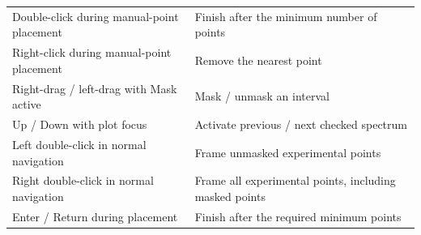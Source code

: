 \documentclass[
  10pt,
  a4paper,
  oneside]{scrreprt}
\begin{document}
\begin{longtable}[]{@{}ll@{}}
\begin{minipage}[t]{0.47\columnwidth}
Double-click during manual-point placement\strut
\end{minipage} & \begin{minipage}[t]{0.47\columnwidth}\raggedright
Finish after the minimum number of points\strut
\end{minipage}\tabularnewline
\begin{minipage}[t]{0.47\columnwidth}\raggedright
Right-click during manual-point placement\strut
\end{minipage} & \begin{minipage}[t]{0.47\columnwidth}\raggedright
Remove the nearest point\strut
\end{minipage}\tabularnewline
\begin{minipage}[t]{0.47\columnwidth}\raggedright
Right-drag / left-drag with Mask active\strut
\end{minipage} & \begin{minipage}[t]{0.47\columnwidth}\raggedright
Mask / unmask an interval\strut
\end{minipage}\tabularnewline
\begin{minipage}[t]{0.47\columnwidth}\raggedright
Up / Down with plot focus\strut
\end{minipage} & \begin{minipage}[t]{0.47\columnwidth}\raggedright
Activate previous / next checked spectrum\strut
\end{minipage}\tabularnewline
\begin{minipage}[t]{0.47\columnwidth}\raggedright
Left double-click in normal navigation\strut
\end{minipage} & \begin{minipage}[t]{0.47\columnwidth}\raggedright
Frame unmasked experimental points\strut
\end{minipage}\tabularnewline
\begin{minipage}[t]{0.47\columnwidth}\raggedright
Right double-click in normal navigation\strut
\end{minipage} & \begin{minipage}[t]{0.47\columnwidth}\raggedright
Frame all experimental points, including masked points\strut
\end{minipage}\tabularnewline
\begin{minipage}[t]{0.47\columnwidth}\raggedright
Enter / Return during placement\strut
\end{minipage} & \begin{minipage}[t]{0.47\columnwidth}\raggedright
Finish after the required minimum points\strut

\end{minipage}
\end{longtable}
\end{document}
